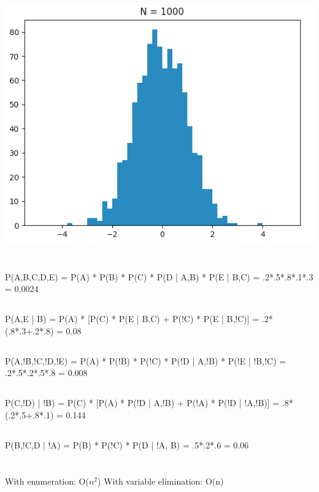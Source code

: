 \documentclass[a4paper]{article}
\begin{document}
\includegraphics[scale=.4]{1000.png}

\section{}
\subsection{}
P(A,B,C,D,E) = P(A) * P(B) * P(C) * P(D | A,B) * P(E | B,C) =  .2*.5*.8*.1*.3 = 0.0024
\subsection{}
P(A,E | B) = P(A) * [P(C) * P(E | B,C) + P(!C) * P(E | B,!C)] = .2*(.8*.3+.2*.8) = 0.08
\subsection{}
P(A,!B,!C,!D,!E) = P(A) * P(!B) * P(!C) * P(!D | A,!B) * P(!E | !B,!C) = .2*.5*.2*.5*.8 = 0.008
\subsection{}
P(C,!D) | !B) = P(C) * [P(A) * P(!D | A,!B) +  P(!A) * P(!D | !A,!B)] = .8*(.2*.5+.8*.1) = 0.144
\subsection{}
P(B,!C,D | !A) = P(B) * P(!C) * P(D | !A, B) = .5*.2*.6 = 0.06

\section{}
\subsection{}
\subsection{}
\subsection{}
With enumeration: O($n^2$) \newline
With variable elimination: O(n)
\end{document}

